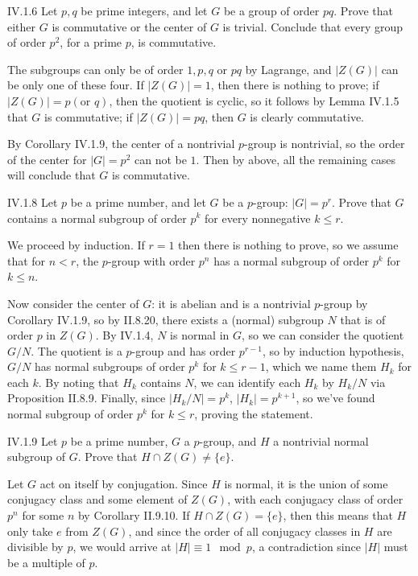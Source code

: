 \begin{problem}{IV.1.6}
Let $p,q$ be prime integers, and let $G$ be a group of order $pq$. Prove that either $G$ is commutative or the center of $G$ is trivial. Conclude that every group of order $p^2$, for a prime $p$, is commutative.
\end{problem}
\begin{pf}
The subgroups can only be of order $1,p,q$ or $pq$ by Lagrange, and $|Z(G)|$ can be only one of these four. If $|Z(G)| = 1$, then there is nothing to prove; if $|Z(G)| = p (\text{or }q)$, then the quotient is cyclic, so it follows by Lemma IV.1.5 that $G$ is commutative; if $|Z(G)| = pq$, then $G$ is clearly commutative.

By Corollary IV.1.9, the center of a nontrivial $p$-group is nontrivial, so the order of the center for $|G| = p^2$ can not be $1$. Then by above, all the remaining cases will conclude that $G$ is commutative. 
\end{pf}

\begin{problem}{IV.1.8}
Let $p$ be a prime number, and let $G$ be a $p$-group: $|G| = p^r$. Prove that $G$ contains a normal subgroup of order $p^k$ for every nonnegative $k \leq r$.
\end{problem}
\begin{pf}
We proceed by induction. If $r = 1$ then there is nothing to prove, so we assume that for $n < r$, the $p$-group with order $p^n$ has a normal subgroup of order $p^k$ for $k \leq n$. 

Now consider the center of $G$: it is abelian and is a nontrivial $p$-group by Corollary IV.1.9, so by II.8.20, there exists a (normal) subgroup $N$ that is of order $p$ in $Z(G)$. By IV.1.4, $N$ is normal in $G$, so we can consider the quotient $G/N$. The quotient is a $p$-group and has order $p^{r-1}$, so by induction hypothesis, $G/N$ has normal subgroups of order $p^k$ for $k \leq r-1$, which we name them $H_k$ for each $k$. By noting that $H_k$ contains $N$, we can identify each $H_k$ by $H_k/N$ via Proposition II.8.9. Finally, since $|H_k/N| = p^k$, $|H_k| = p^{k+1}$, so we've found normal subgroup of order $p^k$ for $k \leq r$, proving the statement.
\end{pf}


\begin{problem}{IV.1.9}
Let $p$ be a prime number, $G$ a $p$-group, and $H$ a nontrivial normal subgroup of $G$. Prove that $H \cap Z(G) \neq \{e\}$. 
\end{problem}
\begin{pf}
Let $G$ act on itself by conjugation. Since $H$ is normal, it is the union of some conjugacy class and some element of $Z(G)$, with each conjugacy class of order $p^n$ for some $n$ by Corollary II.9.10. If $H \cap Z(G) = \{e\}$, then this means that $H$ only take $e$ from $Z(G)$, and since the order of all conjugacy classes in $H$ are divisible by $p$, we would arrive at $|H| \equiv 1 \mod p$, a contradiction since $|H|$ must be a multiple of $p$.
\end{pf}

